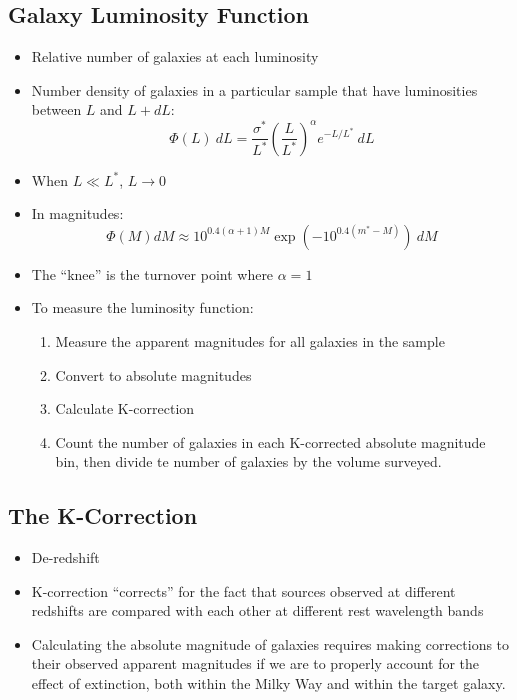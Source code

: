 \documentclass{book}
\begin{document}
\subsection{Galaxy Luminosity Function}
\begin{itemize}
    \item Relative number of galaxies at each luminosity
    \item Number density of galaxies in a particular sample that have luminosities between $L$ and $L + dL$: $$\Phi (L)\ dL = \frac{\sigma^*}{L^*} \left( \frac{L}{L^*}\right)^\alpha e^{-L/L^*}\ dL$$
    \item When $L \ll L^*$, $L \to 0$
    \item In magnitudes: $$\Phi(M) dM \approx 10^{0.4 (\alpha + 1) M}\exp\left( -10^{0.4(m^* - M)} \right)\ dM$$
    \item The ``knee'' is the turnover point where $\alpha = 1$
    \item To measure the luminosity function:
          \begin{enumerate}
              \item Measure the apparent magnitudes for all galaxies in the sample
              \item Convert to absolute magnitudes
              \item Calculate K-correction
              \item Count the number of galaxies in each K-corrected absolute magnitude bin, then divide te number of galaxies by the volume surveyed.
          \end{enumerate}
\end{itemize}
\subsection{The K-Correction}
\begin{itemize}
    \item De-redshift
    \item K-correction ``corrects'' for the fact that sources observed at different redshifts are compared with each other at different rest wavelength bands
    \item Calculating the absolute magnitude of galaxies requires making corrections to their observed apparent magnitudes if we are to properly account for the effect of extinction, both within the Milky Way and within the target galaxy.
\end{itemize}
\end{document}
